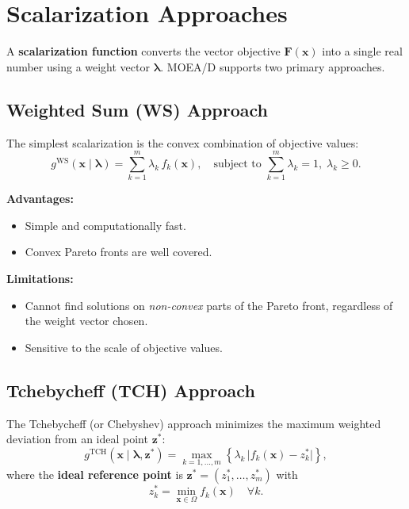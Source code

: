 \documentclass[12pt,a4paper]{article}
\begin{document}
\section{Scalarization Approaches}
\label{sec:scalarization}

A \textbf{scalarization function} converts the vector objective $\mathbf{F}(\mathbf{x})$ into a single real number using a weight vector $\boldsymbol{\lambda}$. MOEA/D supports two primary approaches.

\subsection{Weighted Sum (WS) Approach}

The simplest scalarization is the convex combination of objective values:
\begin{equation}
    g^{\text{WS}}(\mathbf{x} \mid \boldsymbol{\lambda})
    = \sum_{k=1}^{m} \lambda_k \, f_k(\mathbf{x}), \quad
    \text{subject to } \sum_{k=1}^m \lambda_k = 1,\; \lambda_k \geq 0.
    \label{eq:ws}
\end{equation}

\textbf{Advantages:}
\begin{itemize}[leftmargin=1.5cm]
    \item Simple and computationally fast.
    \item Convex Pareto fronts are well covered.
\end{itemize}

\textbf{Limitations:}
\begin{itemize}[leftmargin=1.5cm]
    \item Cannot find solutions on \emph{non-convex} parts of the Pareto front, regardless of the weight vector chosen.
    \item Sensitive to the scale of objective values.
\end{itemize}

\subsection{Tchebycheff (TCH) Approach}

The Tchebycheff (or Chebyshev) approach minimizes the maximum weighted deviation from an ideal point $\mathbf{z}^*$:
\begin{equation}
    g^{\text{TCH}}(\mathbf{x} \mid \boldsymbol{\lambda}, \mathbf{z}^*)
    = \max_{k=1,\ldots,m} \left\{ \lambda_k \, \bigl|f_k(\mathbf{x}) - z_k^*\bigr| \right\},
    \label{eq:tch}
\end{equation}
where the \textbf{ideal reference point} is $\mathbf{z}^* = (z_1^*, \ldots, z_m^*)$ with
\begin{equation}
    z_k^* = \min_{\mathbf{x} \in \Omega} f_k(\mathbf{x}) \quad \forall k.
\end{equation}
\end{document}
